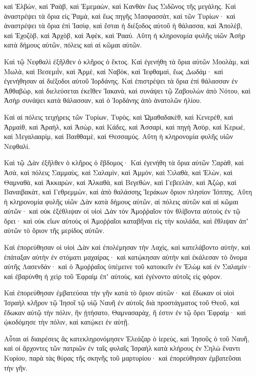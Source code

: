 {καὶ Ἐλβὼν, καὶ Ῥαὰβ, καὶ Ἐμεμαὼν, καὶ Κανθὰν ἕως Σιδῶνος τῆς μεγάλης.
Καὶ ἀναστρέψει τὰ ὅρια εἰς Ῥαμὰ, καὶ ἕως πηγῆς Μασφασσὰτ, καὶ τῶν Τυρίων· καὶ ἀναστρέψει τὰ ὅρια ἐπὶ Ἰασὶφ, καὶ ἔσται ἡ διέξοδος αὐτοῦ ἡ θάλασσα, καὶ Ἀπολὲβ, καὶ Ἐχοζὸβ,
καὶ Ἀρχὸβ, καὶ Ἀφὲκ, καὶ Ῥααύ.
Αὕτη ἡ κληρονομία φυλῆς υἱῶν Ἀσὴρ κατὰ δήμους αὐτῶν, πόλεις καὶ αἱ κῶμαι αὐτῶν.
\par }{\PP {}Καὶ τῷ Νεφθαλὶ ἐξῆλθεν ὁ κλῆρος ὁ ἕκτος.
Καὶ ἐγενήθη τὰ ὅρια αὐτῶν Μοολὰμ, καὶ Μωλὰ, καὶ Βεσεμιῒν, καὶ Ἀρμὲ, καὶ Ναβὸκ, καὶ Ἰεφθαμαὶ, ἕως Δωδάμ· καὶ ἐγενήθησαν αἱ διέξοδοι αὐτοῦ Ἰορδάνης.
Καὶ ἐπιστρέψει τὰ ὅρια ἐπὶ θάλασσαν ἐν Ἀθθαβὼρ, καὶ διελεύσεται ἐκεῖθεν Ἰακανὰ, καὶ συνάψει τῷ Ζαβουλὼν ἀπὸ Νότου, καὶ Ἀσὴρ συνάψει κατὰ θάλασσαν, καὶ ὁ Ἰορδάνης ἀπὸ ἀνατολῶν ἡλίου.
\par }{\PP {}Καὶ αἱ πόλεις τειχήρεις τῶν Τυρίων, Τυρὸς, καὶ Ὠμαθαδακὲθ, καὶ Κενερέθ,
καὶ Ἀρμαὶθ, καὶ Ἀραὴλ, καὶ Ἀσὼρ,
καὶ Κάδες, καὶ Ἀσσαρὶ, καὶ πηγὴ Ἀσὸρ,
καὶ Κερωὲ, καὶ Μεγαλααρὶμ, καὶ Βαιθθαμὲ, καὶ Θεσσαμύς.
Αὕτη ἡ κληρονομία φυλῆς υἱῶν Νεφθαλί.
\par }{\PP {}Καὶ τῷ Δὰν ἐξῆλθεν ὁ κλῆρος ὁ ἕβδομος·
Καὶ ἐγενήθη τὰ ὅρια αὐτῶν Σαρὰθ, καὶ Ἀσὰ, καὶ πόλεις Σαμμαὺς,
καὶ Σαλαμὶν, καὶ Ἀμμὸν, καὶ Σιλαθὰ,
καὶ Ἐλὼν, καὶ Θαμναθὰ, καὶ Ἀκκαρὼν,
καὶ Ἀλκαθὰ, καὶ Βεγεθὼν, καὶ Γεβεελὰν,
καὶ Ἀζὼρ, καὶ Βαναιβακὰτ, καὶ Γεθρεμμὼν,
καὶ ἀπὸ θαλάσσης Ἱεράκων ὅριον πλησίον Ἰόππης.
Αὕτη ἡ κληρονομία φυλῆς υἱῶν Δὰν κατὰ δήμους αὐτῶν, αἱ πόλεις αὐτῶν καὶ αἱ κῶμαι αὐτῶν·
καὶ οὐκ ἐξέθλιψαν οἱ υἱοὶ Δὰν τὸν Ἀμοῤῥαῖον τὸν θλίβοντα αὐτοὺς ἐν τῷ ὄρει· καὶ οὐκ εἴων αὐτοὺς οἱ Ἀμοῤῥαῖοι καταβῆναι εἰς τὴν κοιλάδα, καὶ ἔθλιψαν ἀπʼ αὐτῶν τὸ ὅριον τῆς μερίδος αὐτῶν.
\par }{\PP {}Καὶ ἐπορεύθησαν οἱ υἱοὶ Δὰν καὶ ἐπολέμησαν τὴν Λαχὶς, καὶ κατελάβοντο αὐτὴν, καὶ ἐπάταξαν αὐτὴν ἐν στόματι μαχαίρας· καὶ κατῴκησαν αὐτὴν καὶ ἐκάλεσαν τὸ ὄνομα αὐτῆς Λασενδάν·
καὶ ὁ Ἀμοῤῥαῖος ὑπέμεινε τοῦ κατοικεῖν ἐν Ἐλὼμ καὶ ἐν Σαλαμίν· καὶ ἐβαρύνθη ἡ χεὶρ τοῦ Ἐφραὶμ ἐπʼ αὐτοὺς, καὶ ἐγένοντο αὐτοῖς εἰς φόρον.
\par }{\PP {}Καὶ ἐπορεύθησαν ἐμβατεύσαι τὴν γῆν κατὰ τὸ ὅριον αὐτῶν· καὶ ἔδωκαν οἱ υἱοὶ Ἰσραὴλ κλῆρον τῷ Ἰησοῖ τῷ υἱῷ Ναυῆ ἐν αὐτοῖς
διὰ προστάγματος τοῦ Θεοῦ, καὶ ἔδωκαν αὐτῷ τὴν πόλιν, ἣν ᾐτήσατο, Θαμνασαρὰχ, ἥ ἐστιν ἐν τῷ ὄρει Ἐφραίμ· καὶ ᾠκοδόμησε τὴν πόλιν, καὶ κατῴκει ἐν αὐτῇ.
\par }{\PP {}Αὗται αἱ διαιρέσεις ἃς κατεκληρονόμησεν Ἐλεάζαρ ὁ ἱερεὺς, καὶ Ἰησοῦς ὁ τοῦ Ναυῆ, καὶ οἱ ἄρχοντες τῶν πατριῶν ἐν ταῖς φυλαῖς Ἰσραὴλ κατὰ κλήρους ἐν Σηλὼ ἔναντι Κυρίου, παρὰ τὰς θύρας τῆς σκηνῆς τοῦ μαρτυρίου· καὶ ἐπορεύθησαν ἐμβατεῦσαι τὴν γῆν.

}
